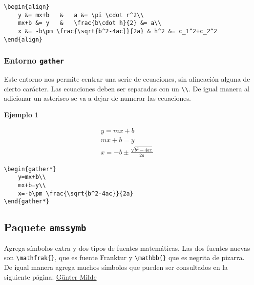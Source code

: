 \begin{myquote}
	\begin{lstlisting}
\begin{align}
	y &= mx+b 	& 	a &= \pi \cdot r^2\\
	mx+b &= y 	& 	\frac{b\cdot h}{2} &= a\\
	x &= -b\pm \frac{\sqrt{b^2-4ac}}{2a} & h^2 &= c_1^2+c_2^2
\end{align}
	\end{lstlisting}
\end{myquote}

\subsubsection{Entorno \texttt{gather}}

Este entorno nos permite centrar una serie de ecuaciones, sin alineación alguna de cierto carácter. Las ecuaciones deben ser separadas con un \verb|\\|. De igual manera al adicionar un asterisco se va a dejar de numerar las ecuaciones.

\textbf{Ejemplo 1}

\begin{gather*}
	y=mx+b\\
	mx+b=y\\
	x=-b\pm \frac{\sqrt{b^2-4ac}}{2a}
\end{gather*}

\begin{myquote}
	\begin{lstlisting}
\begin{gather*}
	y=mx+b\\
	mx+b=y\\
	x=-b\pm \frac{\sqrt{b^2-4ac}}{2a}
\end{gather*}
	\end{lstlisting}
\end{myquote}

\subsection{Paquete \texttt{amssymb}}

Agrega símbolos extra y dos tipos de fuentes matemáticas. Las dos fuentes nuevas son \verb|\mathfrak{}|, que es fuente Franktur y \verb|\mathbb{}| que es negrita de pizarra. De igual manera agrega muchos símbolos que pueden ser consultados en la siguiente página: \href{http://milde.users.sourceforge.net/LUCR/Math/mathpackages/amssymb-symbols.pdf}{\textcolor{light-blue}{Günter Milde}}

